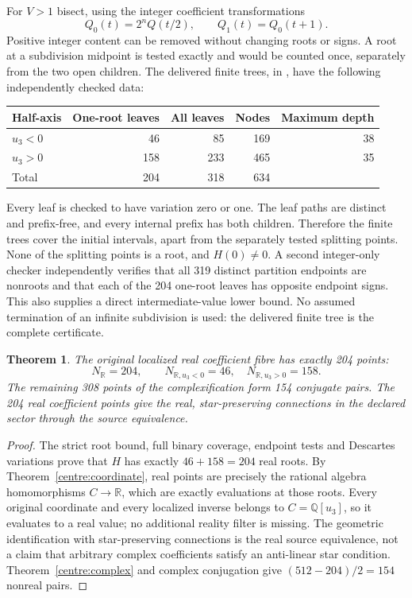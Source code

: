 \documentclass[11pt,a4paper]{article}
\newtheorem{theorem}{Theorem}[section]
\theoremstyle{remark}\newtheorem{remark}[theorem]{Remark}
\begin{document}
For $V>1$ bisect, using the integer coefficient transformations
\[
 Q_0(t)=2^nQ(t/2),\qquad Q_1(t)=Q_0(t+1).
\]
Positive integer content can be removed without changing roots or
signs. A root at a subdivision midpoint is tested exactly and would
be counted once, separately from the two open children. The delivered
finite trees, in , have the following
independently checked data:
\begin{center}
\begin{tabular}{lrrrr}
\toprule
Half-axis & One-root leaves & All leaves & Nodes & Maximum depth\\
\midrule
$u_3<0$ &46&85&169&38\\
$u_3>0$ &158&233&465&35\\
\midrule
Total &204&318&634&\\
\bottomrule
\end{tabular}
\end{center}
Every leaf is checked to have variation zero or one. The leaf paths
are distinct and prefix-free, and every internal prefix has both
children. Therefore the finite trees cover the initial intervals,
apart from the separately tested splitting points. None of the
splitting points is a root, and $H(0)\ne0$. A second integer-only
checker independently verifies that all 319 distinct partition
endpoints are nonroots and that each of the 204 one-root leaves has
opposite endpoint signs. This also supplies a direct intermediate-value
lower bound. No assumed termination of an infinite subdivision is
used: the delivered finite tree is the complete certificate.

\begin{theorem}\label{centre:real}
The original localized real coefficient fibre has exactly 204 points:
\[
 N_{\mathbb R}=204,
 \qquad N_{\mathbb R,u_3<0}=46,\quad N_{\mathbb R,u_3>0}=158.
\]
The remaining 308 points of the complexification form 154 conjugate
pairs. The 204 real coefficient points give the real, star-preserving
connections in the declared sector through the source equivalence.
\end{theorem}
\begin{proof}
The strict root bound, full binary coverage, endpoint tests and Descartes
variations prove that $H$ has exactly $46+158=204$ real roots. By
Theorem~\ref{centre:coordinate}, real points are precisely the rational
algebra homomorphisms $C\to\mathbb R$, which are exactly evaluations
at those roots. Every original coordinate and every localized inverse
belongs to $C=\mathbb Q[u_3]$, so it evaluates to a real value; no
additional reality filter is missing. The geometric identification
with star-preserving connections is the real source equivalence, not
a claim that arbitrary complex coefficients satisfy an anti-linear
star condition. Theorem~\ref{centre:complex} and complex conjugation
give $(512-204)/2=154$ nonreal pairs.
\end{proof}
\end{document}
